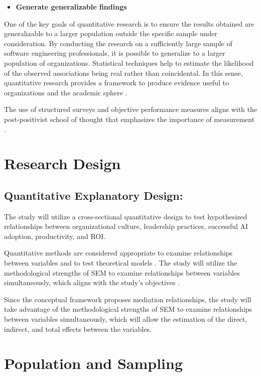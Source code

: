 \begin{itemize}
	\item \textbf{Generate generalizable findings} 
\end{itemize}
One of the key goals of quantitative research is to ensure the results obtained are generalizable to a larger population outside the specific sample under consideration. By conducting the research on a sufficiently large sample of software engineering professionals, it is possible to generalize to a larger population of organizations. Statistical techniques help to estimate the likelihood of the observed associations being real rather than coincidental. In this sense, quantitative research provides a framework to produce evidence useful to organizations and the academic sphere \autocite{Bryman2016}.

The use of structured surveys and objective performance measures aligns with the post-positivist school of thought that emphasizes the importance of measurement \autocite{Hair2019}.

\section{Research Design}
\label{sec:Research Design}
\subsection {Quantitative Explanatory Design: }
\label{sec:Quantitative Explanatory Design}
The study will utilize a cross-sectional quantitative design to test hypothesized relationships between organizational culture, leadership practices, successful AI adoption, productivity, and ROI.

Quantitative methods are considered appropriate to examine relationships between variables and to test theoretical models \autocite{Bryman2016}. The study will utilize the methodological strengths of SEM to examine relationships between variables simultaneously, which aligns with the study's objectives \autocite{Hair2019}.

Since the conceptual framework proposes mediation relationships, the study will take advantage of the methodological strengths of SEM to examine relationships between variables simultaneously, which will allow the estimation of the direct, indirect, and total effects between the variables.

\section{Population and Sampling}
\label{sec:Population and Sampling}
